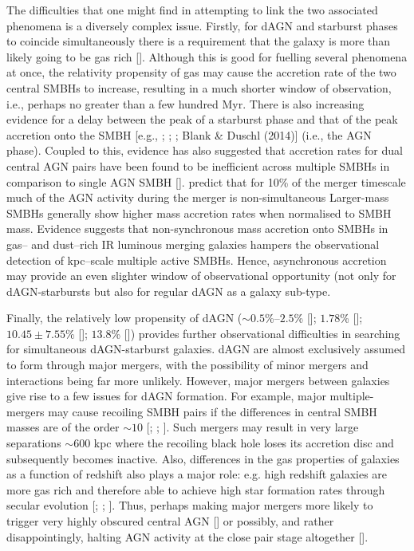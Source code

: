 The difficulties that one might find in attempting to link the two associated phenomena is a diversely complex issue. Firstly, for dAGN and starburst phases to coincide simultaneously there is a requirement that the galaxy is more than likely going to be gas rich [\cite{Hopkins_2012}]. Although this is good for fuelling several phenomena at once, the relativity propensity of gas may cause the accretion rate of the two central SMBHs to increase, resulting in a much shorter window of observation, i.e., perhaps no greater than a few hundred Myr. There is also increasing evidence for a delay between the peak of a starburst phase and that of the peak accretion onto the SMBH [e.g., \cite{Di_Matteo_2005}; \cite{Wild_2010}; \cite{Hopkins_2012}; Blank \& Duschl (2014)] (i.e., the AGN phase). Coupled to this, evidence has also  suggested that accretion rates for dual central AGN pairs have been found to be inefficient across multiple SMBHs in comparison to single AGN SMBH [\cite{Dotti_Bellovary_Callegari_2012}]. \cite{Dotti_Bellovary_Callegari_2012} predict that for 10\% of the merger timescale much of the AGN activity during the merger is non-simultaneous  Larger-mass SMBHs generally show higher mass accretion rates when normalised to SMBH mass. Evidence suggests that non-synchronous mass accretion onto SMBHs in gas-- and dust--rich IR luminous merging galaxies hampers the observational detection of kpc--scale multiple active SMBHs. Hence, asynchronous accretion may provide an even slighter window of observational opportunity (not only for dAGN-starbursts but also for regular dAGN as a galaxy sub-type. 

Finally, the relatively low propensity of dAGN ($\sim{0.5}$\%--$2.5$\% [\cite{Shen_Liu_Greene_Strauss_2011}]; $1.78$\% [\cite{Ge_Hu_Wang_Bai_Zhang_2012}]; $10.45{\pm}7.55$\% [\cite{rford_Schluns_Greene_Cool_2013}]; $13.8$\% [\cite{2014ApJ...780..106I}]) provides further observational difficulties in searching for simultaneous dAGN-starburst galaxies. dAGN are almost exclusively assumed to form through major mergers, with the possibility of minor mergers and interactions being far more unlikely. However, major mergers between galaxies give rise to a few issues for dAGN formation. For example, major multiple-mergers may cause recoiling SMBH pairs if the differences in central SMBH masses are of the order $\sim{10}$ [\cite{onning_Shields_Salviander_2007}; \cite{Gualandris_Merritt_2008}; \cite{Blecha_Civano_Elvis_Loeb_2013}]. Such mergers may result in very large separations $\sim{600}$ kpc where the recoiling black hole loses its accretion disc and subsequently becomes inactive. Also, differences in the gas properties of galaxies as a function of redshift also plays a major role: e.g. high redshift galaxies are more gas rich and therefore able to achieve high star formation rates through secular evolution [\cite{Hicks_Friedrich_Sternberg_2007}; \cite{2010ApJ...715..202H}; \cite{Draper_Ballantyne_2012}]. Thus, perhaps making major mergers more likely to trigger very highly obscured central AGN [\cite{2009ApJ...698L.116P}] or possibly, and rather disappointingly, halting AGN activity at the close pair stage altogether [\cite{Scott_Kaviraj_2013}].

